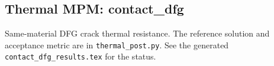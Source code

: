 \subsection{Thermal MPM: contact\_dfg}
Same-material DFG crack thermal resistance. The reference solution and acceptance metric are in \texttt{thermal\_post.py}. See the generated \texttt{contact\_dfg\_results.tex} for the status.
